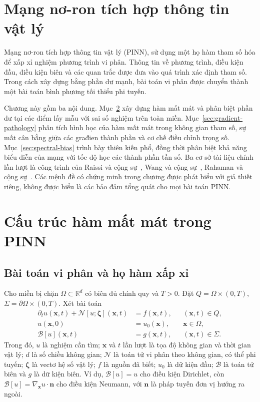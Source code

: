 \section{Mạng nơ-ron tích hợp thông tin vật lý}
\label{chap:pinn}
Mạng nơ-ron tích hợp thông tin vật lý (PINN), sử dụng một họ hàm
tham số hóa để xấp xỉ nghiệm phương trình vi phân. Thông tin về phương trình,
điều kiện đầu, điều kiện biên và các quan trắc được đưa vào quá trình xác
định tham số. Trong cách xây dựng bằng phần dư mạnh, bài toán vi phân được
chuyển thành một bài toán bình phương tối thiểu phi tuyến.

Chương này gồm ba nội dung. Mục~\ref{sec:cau-truc-loss} xây dựng hàm mất
mát và phân biệt phần dư tại các điểm lấy mẫu với sai số nghiệm trên toàn
miền. Mục~\ref{sec:gradient-pathology} phân tích hình học của hàm mất mát
trong không gian tham số, sự mất cân bằng giữa các građien thành phần và
cơ chế điều chỉnh trọng số. Mục~\ref{sec:spectral-bias} trình bày thiên
kiến phổ, đồng thời phân biệt khả năng biểu diễn của mạng với tốc độ học
các thành phần tần số. Ba cơ sở tài liệu chính lần lượt là công trình của
Raissi và cộng sự~\cite{raissi2019}, Wang và cộng sự~\cite{wang2021},
Rahaman và cộng sự~\cite{rahaman2019}. Các mệnh đề có chứng minh trong
chương được phát biểu với giả thiết riêng, không được hiểu là các bảo đảm
tổng quát cho mọi bài toán PINN.

\section{Cấu trúc hàm mất mát trong PINN}
\label{sec:cau-truc-loss}

\subsection{Bài toán vi phân và họ hàm xấp xỉ}

Cho miền bị chặn $\Omega\subset\mathbb{R}^{d}$ có biên đủ chính quy và
$T>0$. Đặt $Q=\Omega\times(0,T)$,
$\Sigma=\partial\Omega\times(0,T)$. Xét bài toán
\begin{align}
 \partial_tu(\mathbf{x},t)+\mathcal{N}[u;\boldsymbol{\zeta}](\mathbf{x},t)
 &=f(\mathbf{x},t), &&(\mathbf{x},t)\in Q,\label{p4:eq:pde}\\
 u(\mathbf{x},0)&=u_0(\mathbf{x}),&&\mathbf{x}\in\Omega,\label{p4:eq:ic}\\
 \mathcal{B}[u](\mathbf{x},t)&=g(\mathbf{x},t),&&
                   (\mathbf{x},t)\in\Sigma.\label{p4:eq:bc}
\end{align}
Trong đó, $u$ là nghiệm cần tìm; $\mathbf{x}$ và $t$ lần lượt là tọa độ
không gian và thời gian vật lý; $d$ là số chiều không gian;
$\mathcal{N}$ là toán tử vi phân theo không gian, có thể phi tuyến;
$\boldsymbol{\zeta}$ là vectơ hệ số vật lý; $f$ là nguồn đã biết;
$u_0$ là dữ kiện đầu; $\mathcal{B}$ là toán tử biên và $g$ là dữ kiện biên.
Ví dụ, $\mathcal{B}[u]=u$ cho điều kiện Dirichlet, còn
$\mathcal{B}[u]=\nabla_{\mathbf{x}}u\cdot\mathbf{n}$ cho điều kiện Neumann,
với $\mathbf{n}$ là pháp tuyến đơn vị hướng ra ngoài.

